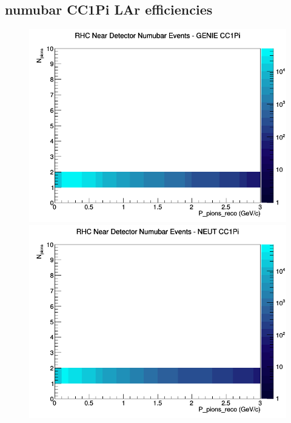 \documentclass[12pt]{article}
\begin{document}
\subsection{numubar CC1Pi LAr efficiencies}
\begin{figure}[h]
\includegraphics[width=\linewidth]{eff_N_P/LAr/pions/CC1Pi_RHC_ND_numubar_N_P_GENIE.png}
\endminipage
{}
\includegraphics[width=\linewidth]{eff_N_P/LAr/pions/CC1Pi_RHC_ND_numubar_N_P_NEUT.png}
\endminipage
{}

\end{figure}
\end{document}
